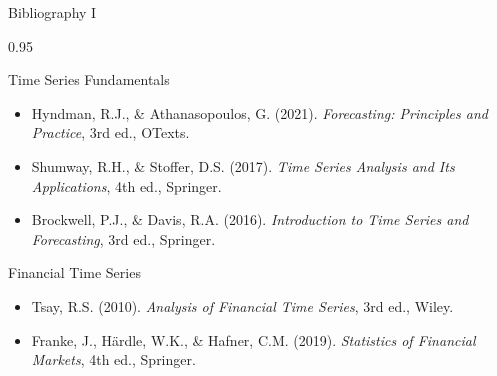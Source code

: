 \documentclass[9pt, aspectratio=169, t]{beamer}
\begin{document}
\begin{frame}{Bibliography I}
    \begin{cminipage}{0.95\textwidth}
    \begin{block}{Time Series Fundamentals}
        {\small
        \begin{itemize}\setlength{\itemsep}{0pt}
            \item Hyndman, R.J., \& Athanasopoulos, G. (2021). \textit{Forecasting: Principles and Practice}, 3rd ed., OTexts.
            \item Shumway, R.H., \& Stoffer, D.S. (2017). \textit{Time Series Analysis and Its Applications}, 4th ed., Springer.
            \item Brockwell, P.J., \& Davis, R.A. (2016). \textit{Introduction to Time Series and Forecasting}, 3rd ed., Springer.
        \end{itemize}
        }
    \end{block}

    \begin{exampleblock}{Financial Time Series}
        {\small
        \begin{itemize}\setlength{\itemsep}{0pt}
            \item Tsay, R.S. (2010). \textit{Analysis of Financial Time Series}, 3rd ed., Wiley.
            \item Franke, J., H\"ardle, W.K., \& Hafner, C.M. (2019). \textit{Statistics of Financial Markets}, 4th ed., Springer.
        \end{itemize}
        }
    \end{exampleblock}
    \end{cminipage}
\end{frame}
\end{document}
